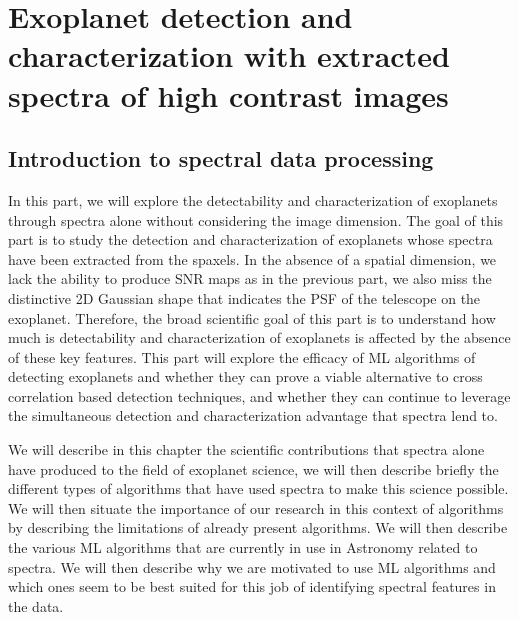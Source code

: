 \part{Exoplanet detection and characterization with extracted spectra of high contrast images}
\startcontents[chapters]
\printmyminitoc{}
\chapter{Introduction to spectral data processing}\label{chap: II.1}

In this part, we will explore the detectability and characterization of exoplanets through spectra alone without considering the image dimension. 
The goal of this part is to study the detection and characterization of exoplanets whose spectra have been extracted from the spaxels.
In the absence of a spatial dimension, we lack the ability to produce SNR maps as in the previous part, we also miss the distinctive 2D Gaussian shape that indicates the PSF of the telescope on the exoplanet.
Therefore, the broad scientific goal of this part is to understand how much is detectability and characterization of exoplanets is affected by the absence of these key features.
This part will explore the efficacy of ML algorithms of detecting exoplanets and whether they can prove a viable alternative to cross correlation based detection techniques, and whether they can continue to leverage the simultaneous detection and characterization advantage that spectra lend to.

We will describe in this chapter the scientific contributions that spectra alone have produced to the field of exoplanet science, we will then describe briefly the different types of algorithms that have used spectra to make this science possible. 
We will then situate the importance of our research in this context of algorithms by describing the limitations of already present algorithms. 
We will then describe the various ML algorithms that are currently in use in Astronomy related to spectra.
We will then describe why we are motivated to use ML algorithms and which ones seem to be best suited for this job of identifying spectral features in the data.
